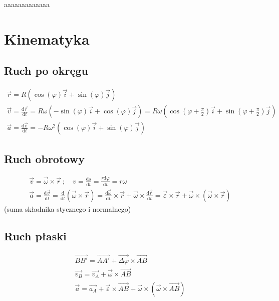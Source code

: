 \documentclass[12pt,a4paper]{article}
\begin{document}
aaaaaaaaaaaaa

\section*{Kinematyka}

\subsection*{Ruch po okręgu}
\begin{gather*}
   \vec{r} = R \left( \cos(\varphi)\vec{i} + \sin(\varphi)\vec{j} \right) \\
   \vec{v} = \frac{\mathrm{d}\vec{r}}{\mathrm{d}t} = R\omega \left( -\sin(\varphi)\vec{i}+\cos(\varphi)\vec{j} \right) = R\omega \left( \cos\left( \varphi+\frac{\pi}{2} \right)\vec{i}+\sin\left( \varphi+\frac{\pi}{2} \right)\vec{j} \right)\\
   \vec{a} = \frac{\mathrm{d}\vec{v}}{\mathrm{d}t} = -R\omega^2 \left( \cos(\varphi)\vec{i} + \sin(\varphi)\vec{j} \right)
\end{gather*}

\subsection*{Ruch obrotowy}
\begin{gather*}
   \vec{v} = \vec{\omega}\times\vec{r}\ ; \quad v = \frac{\mathrm{d}s}{\mathrm{d}t} = \frac{r\mathrm{d}\varphi}{\mathrm{d}t} = r\omega\\
   \vec{a} = \frac{\mathrm{d}\vec{v}}{\mathrm{d}t} = \frac{\mathrm{d}}{\mathrm{d}t} \left( \vec{\omega} \times \vec{r} \right) = \frac{\mathrm{d}\vec{\omega}}{\mathrm{d}t} \times \vec{r} + \vec{\omega} \times \frac{\mathrm{d}\vec{r}}{\mathrm{d}t} = \vec{\varepsilon} \times \vec{r}+\vec{\omega}\times\left( \vec{\omega}\times \vec{r} \right)
\end{gather*}
\qquad (suma składnika stycznego i normalnego)

\subsection*{Ruch płaski}
\begin{gather*}
   \vec{BB'} = \vec{AA'} + \vec{\Delta \varphi}\times\vec{AB}\\
   \vec{v_B} = \vec{v_A}+\vec{\omega}\times\vec{AB}\\
   \vec{a} = \vec{a_A} + \vec{\varepsilon} \times \vec{AB}+\vec{\omega}\times\left( \vec{\omega}\times \vec{AB} \right)
\end{gather*}
\end{document}
